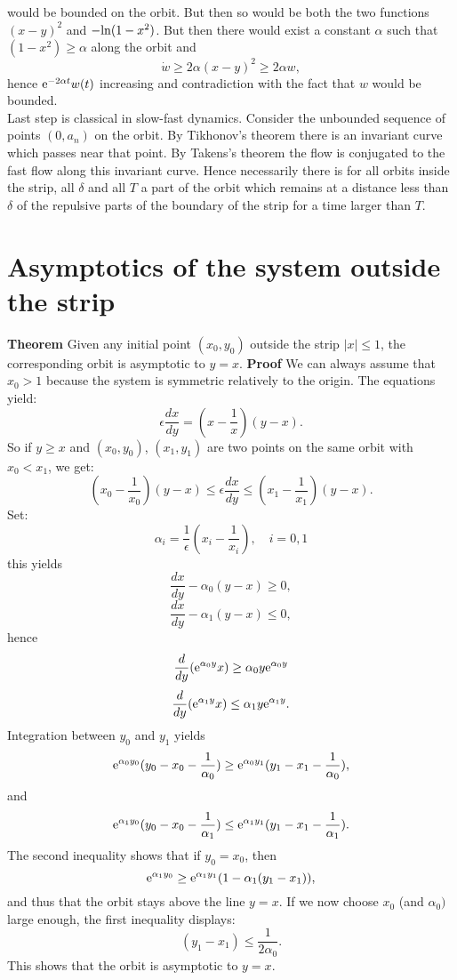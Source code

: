 \documentclass[12pt,psamsfonts]{amsart}
\begin{document}
would be bounded on the orbit. But then so would be both the two
functions $(x-y)^2$ and $-{\rm ln}(1-x^2)$. But then there would
exist a constant $\alpha$ such that $(1-x^2)\geq \alpha$ along the
orbit and
$${\dot w}\geq 2{\alpha}(x-y)^2\geq 2{\alpha}w,$$
hence ${\rm e}^{-2{\alpha}t}w(t)$ increasing and contradiction
with the fact that $w$ would be bounded.\\
Last step is classical in slow-fast dynamics. Consider the
unbounded sequence of points $(0,a_n)$ on the orbit. By Tikhonov's
theorem there is an invariant curve which passes near that
point. By Takens's theorem the flow is conjugated to the fast flow
along this invariant curve. Hence necessarily there is for all
orbits inside the strip, all $\delta$ and all $T$  a part of the
orbit which remains at a distance less than $\delta$ of the
repulsive parts of the boundary of the strip for a time larger
than $T$.

\section{Asymptotics of the system outside the strip}

{\bf Theorem}
\vskip 1pt
Given any initial point $(x_0,y_0)$ outside the strip $\mid x\mid\leq
1$, the corresponding orbit is asymptotic to $y=x$.
\vskip 1pt
{\bf Proof}
\vskip 1pt
We can always assume that $x_0>1$ because the system is symmetric
relatively to the origin. The equations yield:
$$\epsilon\frac{dx}{dy}=(x-\frac{1}{x})(y-x).$$
So if $y\geq x$ and $(x_0,y_0)$, $(x_1,y_1)$ are two points on the
same orbit with $x_0<x_1$, we get:
$$(x_0-\frac{1}{x_0})(y-x)\leq {\epsilon}\frac{dx}{dy}\leq (x_1-\frac{1}{x_1})(y-x).$$
Set:
$$\alpha_i=\frac{1}{\epsilon}(x_i-\frac{1}{x_i}),\quad i=0,1$$
this yields
$$\frac{dx}{dy}-\alpha_0(y-x)\geq 0,$$
$$\frac{dx}{dy}-\alpha_1(y-x)\leq 0,$$
hence
$$\frac{d}{dy}({\rm e}^{\alpha_0y}x)\geq \alpha_0y{\rm e}^{\alpha_0y}$$
$$\frac{d}{dy}({\rm e}^{\alpha_1y}x)\leq \alpha_1y{\rm e}^{\alpha_1y}.$$
Integration between $y_0$ and $y_1$ yields
$${\rm e}^{\alpha_0y_0}(y_0-x_0-\frac{1}{\alpha_0})\geq {\rm e}^{\alpha_0y_1}
(y_1-x_1-\frac{1}{\alpha_0}),$$
and
$${\rm e}^{\alpha_1y_0}(y_0-x_0-\frac{1}{\alpha_1})\leq {\rm e}^{\alpha_1y_1}
(y_1-x_1-\frac{1}{\alpha_1}).$$
The second inequality shows that if $y_0=x_0$, then
$${\rm e}^{\alpha_1y_0}\geq {\rm e}^{\alpha_1y_1}(1-\alpha_1(y_1-x_1)),$$
and thus that the orbit stays above the line $y=x$. If we now
choose $x_0$ (and $\alpha_0)$ large enough, the first inequality
displays:
$$(y_1-x_1)\leq \frac{1}{2\alpha_0}.$$
This shows that the orbit is asymptotic to $y=x$.
\end{document}
